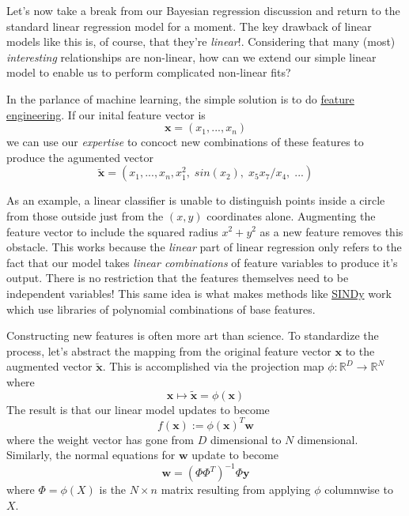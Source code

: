 Let's now take a break from our Bayesian regression discussion and return to the standard linear regression model for a moment. The key drawback of linear models like this is, of course, that they're \textit{linear}!. Considering that many (most) \textit{interesting} relationships are non-linear, how can we extend our simple linear model to enable us to perform complicated non-linear fits?

In the parlance of machine learning, the simple solution is to do \href{https://en.wikipedia.org/wiki/Feature_engineering}{feature engineering}. If our inital feature vector is
\begin{equation}
    \mathbf{x} = (x_1, ..., x_n)
\end{equation}
we can use our \textit{expertise} to concoct new combinations of these features to produce the agumented vector
\begin{equation}
    \tilde{\mathbf{x}} = (x_1, ..., x_n, x_1^2, \;sin(x_2), \;x_5x_7/x_4,\;...)
\end{equation}

As an example, a linear classifier is unable to distinguish points inside a circle from those outside just from the $(x,y)$ coordinates alone. Augmenting the feature vector to include the squared radius $x^2+y^2$ as a new feature removes this obstacle. This works because the \textit{linear} part of linear regression only refers to the fact that our model takes \textit{linear combinations} of feature variables to produce it's output. There is no restriction that the features themselves need to be independent variables! This same idea is what makes methods like \href{https://www.pnas.org/doi/10.1073/pnas.1517384113}{SINDy} work which use libraries of polynomial combinations of base features.

Constructing new features is often more art than science. To standardize the process, let's abstract the mapping from the original feature vector $\mathbf{x}$ to the augmented vector $\tilde{\mathbf{x}}$. This is accomplished via the projection map $\phi:\mathbb{R}^D \to \mathbb{R}^N$ where
\begin{equation}
    \mathbf{x} \mapsto \tilde{\mathbf{x}} = \phi(\mathbf{x})
\end{equation}
The result is that our linear model updates to become
\begin{equation}
    f(\mathbf{x}) := \phi(\mathbf{x})^T\mathbf{w}
\end{equation}
where the weight vector has gone from $D$ dimensional to $N$ dimensional. Similarly, the normal equations for $\mathbf{w}$ update to become
\begin{equation}
    \mathbf{w} = (\Phi\Phi^T)^{-1}\Phi\mathbf{y}
\end{equation}
where $\Phi = \phi(X)$ is the $N\times n$ matrix resulting from applying $\phi$ columnwise to $X$.


